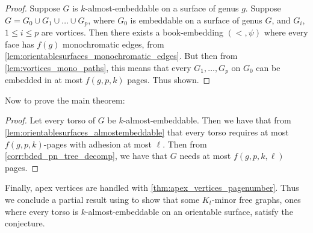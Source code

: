 \begin{proof}
	Suppose $G$ is $k$-almost-embeddable on a surface of genus $g$. Suppose $G = G_0 \cup G_1 \cup \ldots \cup G_p$, where $G_0$ is embeddable on a surface of genus $G$, and $G_i$, $1 \leq i \leq p$ are vortices. Then there exists a book-embedding $(<, \psi)$ where every face has $f(g)$ monochromatic edges, from \cref{lem:orientablesurfaces_monochromatic_edges}. But then from \cref{lem:vortices_mono_paths}, this means that every $G_1, \ldots, G_p$ on $G_0$ can be embedded in at most $f(g, p, k)$ pages. Thus shown.
\end{proof}

Now to prove the main theorem:
\begin{proof}
	Let every torso of $G$ be $k$-almost-embeddable. Then we have that from \cref{lem:orientablesurfaces_almostembeddable} that every torso requires at most $f(g, p, k)$-pages with adhesion at most $\ell$. Then from \cref{corr:bded_pn_tree_decomp}, we have that $G$ needs at most $f(g, p, k, \ell)$ pages.
\end{proof}
Finally, apex vertices are handled with \cref{thm:apex_vertices_pagenumber}. Thus we conclude a partial result using \textcite{robertsonGraphMinorsXVI2003} to show that some $K_t$-minor free graphs, ones where every torso is $k$-almost-embeddable on an orientable surface, satisfy the conjecture.
